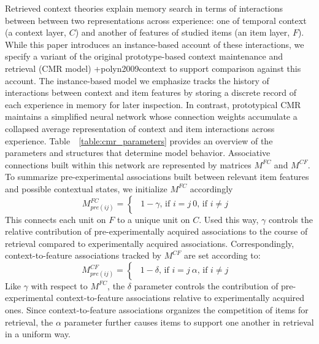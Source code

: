 Retrieved context theories explain memory search in terms of interactions between between two representations across experience: one of temporal context (a context layer, $C$) and another of features of studied items (an item layer, $F$). While this paper introduces an instance-based account of these interactions, we specify a variant of the original prototype-based context maintenance and retrieval (CMR model) +{}{}{polyn2009context} to support comparison against this account. The instance-based model we emphasize tracks the history of interactions between context and item features by storing a discrete record of each experience in memory for later inspection. In contrast, prototypical CMR maintains a simplified neural network whose connection weights accumulate a collapsed average representation of context and item interactions across experience. Table ~\ref{table:cmr_parameters} provides an overview of the parameters and structures that determine model behavior.\markdownRendererInterblockSeparator
{}\markdownRendererInterblockSeparator
{}Associative connections built within this network are represented by matrices $M^{FC}$ and $M^{CF}$.\markdownRendererInterblockSeparator
{}To summarize pre-experimental associations built between relevant item features and possible contextual states, we initialize $M^{FC}$ accordingly\markdownRendererInterblockSeparator
{}$$M^{FC}_{pre(ij)} = \begin{cases} \begin{alignedat}{2} 1 - \gamma \text{, if } i=j \ 0 \text{, if } i \neq j\ \end{alignedat} \end{cases}$$\markdownRendererInterblockSeparator
{}This connects each unit on $F$ to a unique unit on $C$. Used this way, $\gamma$ controls the relative contribution of pre-experimentally acquired associations to the course of retrieval compared to experimentally acquired associations. Correspondingly, context-to-feature associations tracked by $M^{CF}$ are set according to:\markdownRendererInterblockSeparator
{}$$M^{CF}_{pre(ij)} = \begin{cases} \begin{alignedat}{2} 1 - \delta \text{, if } i=j \ \alpha \text{, if } i \neq j\ \end{alignedat} \end{cases}$$\markdownRendererInterblockSeparator
{}Like $\gamma$ with respect to $M^{FC}$, the $\delta$ parameter controls the contribution of pre-experimental context-to-feature associations relative to experimentally acquired ones. Since context-to-feature associations organizes the competition of items for retrieval, the $\alpha$ parameter further causes items to support one another in retrieval in a uniform way.\markdownRendererInterblockSeparator
